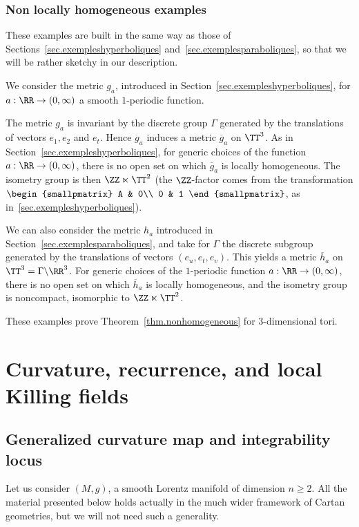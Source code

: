 \subsubsection{Non locally homogeneous examples}\label{sec.exemplestorus2}

These examples are built in the same way as those of Sections~\ref{sec.exempleshyperboliques} and~\ref{sec.exemplesparaboliques}, so that we will be rather sketchy in our description.

We consider the metric $g_a$, introduced in Section~\ref{sec.exempleshyperboliques}, for $a: \RR \to (0,\infty)$ a smooth $1$-periodic function.

The metric $g_a$ is invariant by the discrete group $\Gamma$ generated by the translations of vectors $e_1,e_2$ and $e_t$. Hence $g_a$ induces a metric $\overline{g}_a$ on $\TT^3$. As in Section~\ref{sec.exempleshyperboliques}, for generic choices of the function $a:\RR \to (0,\infty)$, there is no open set on which $\overline{g}_a$ is locally homogeneous. The isometry group is then $\ZZ \ltimes \TT^2$ (the $\ZZ$-factor comes from the transformation $
\begin{smallpmatrix} A & 0\\ 0 & 1
\end{smallpmatrix}$, as in~\ref{sec.exempleshyperboliques}).


We can also consider the metric $h_a$ introduced in Section~\ref{sec.exemplesparaboliques}, and take for $\Gamma$ the discrete subgroup generated by the translations of vectors $(e_u,e_t,e_v)$. This yields a metric $\overline{h}_a$ on $\TT^3=\Gamma \backslash \RR^3$. For generic choices of the $1$-periodic function $a:\RR \to (0,\infty)$, there is no open set on which $\overline{h}_a$ is locally homogeneous, and the isometry group is noncompact, isomorphic to $\ZZ \ltimes \TT^2$.

These examples prove Theorem~\ref{thm.nonhomogeneous} for $3$-dimensional tori.


\section{Curvature, recurrence, and local Killing fields}\label{sec.gromov}
\subsection{Generalized curvature map and integrability locus}\label{sec.curvaturemap}

Let us consider $(M,g)$, a smooth Lorentz manifold of dimension $n \geq 2$. All the material presented below holds actually in the much wider framework of Cartan geometries, but we will not need such a generality.

